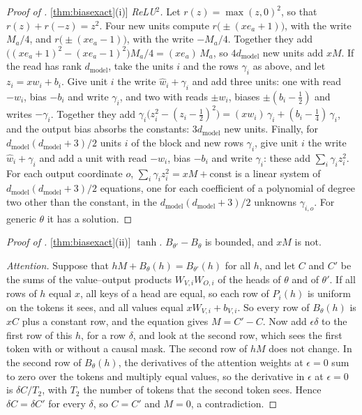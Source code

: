 \documentclass[10pt]{article}
\theoremstyle{definition}
\theoremstyle{remark}
\newcommand{\dm}{d_{\mathrm{model}}}
\DeclareRobustCommand{\cpref}[2]{\hyperref[#1:#2]{\cref*{#1}(#2)}}
\begin{document}
\begin{proof}[Proof of \cpref{thm:biasexact}{i}]
\emph{ReLU$^2$.} Let $r(z) = \max(z, 0)^2$, so that $r(z) + r(-z) = z^2$. Four new units compute $r\big(\pm(xe_a + 1)\big)$, with the write $M_a/4$, and $r\big(\pm(xe_a - 1)\big)$, with the write $-M_a/4$. Together they add $\big((xe_a + 1)^2 - (xe_a - 1)^2\big)M_a/4 = (xe_a)\,M_a$, so $4\dm$ new units add $xM$. If the read has rank $\dm$, take the units $i$ and the rows $\gamma_i$ as above, and let $z_i = xw_i + b_i$. Give unit $i$ the write $\hat w_i + \gamma_i$ and add three units: one with read $-w_i$, bias $-b_i$ and write $\gamma_i$, and two with reads $\pm w_i$, biases $\pm(b_i - \frac12)$ and writes $-\gamma_i$. Together they add $\gamma_i\big(z_i^2 - (z_i - \tfrac12)^2\big) = (xw_i)\,\gamma_i + (b_i - \tfrac14)\,\gamma_i$, and the output bias absorbs the constants: $3\dm$ new units. Finally, for $\dm(\dm+3)/2$ units $i$ of the block and new rows $\gamma_i$, give unit $i$ the write $\hat w_i + \gamma_i$ and add a unit with read $-w_i$, bias $-b_i$ and write $\gamma_i$: these add $\sum_i \gamma_iz_i^2$. For each output coordinate $o$, $\sum_i \gamma_iz_i^2 = xM + \text{const}$ is a linear system of $\dm(\dm+3)/2$ equations, one for each coefficient of a polynomial of degree two other than the constant, in the $\dm(\dm+3)/2$ unknowns $\gamma_{i,o}$. For generic $\theta$ it has a solution.
\end{proof}

\begin{proof}[Proof of \cpref{thm:biasexact}{ii}]
\emph{$\tanh$.} $B_{\theta'} - B_\theta$ is bounded, and $xM$ is not.

\emph{Attention.} Suppose that $hM + B_\theta(h) = B_{\theta'}(h)$ for all $h$, and let $C$ and $C'$ be the sums of the value--output products $W_{V,i}W_{O,i}$ of the heads of $\theta$ and of $\theta'$. If all rows of $h$ equal $x$, all keys of a head are equal, so each row of $P_i(h)$ is uniform on the tokens it sees, and all values equal $xW_{V,i} + b_{V,i}$. So every row of $B_\theta(h)$ is $xC$ plus a constant row, and the equation gives $M = C' - C$. Now add $\epsilon\delta$ to the first row of this $h$, for a row $\delta$, and look at the second row, which sees the first token with or without a causal mask. The second row of $hM$ does not change. In the second row of $B_\theta(h)$, the derivatives of the attention weights at $\epsilon = 0$ sum to zero over the tokens and multiply equal values, so the derivative in $\epsilon$ at $\epsilon = 0$ is $\delta C/T_2$, with $T_2$ the number of tokens that the second token sees. Hence $\delta C = \delta C'$ for every $\delta$, so $C = C'$ and $M = 0$, a contradiction.
\end{proof}
\end{document}
